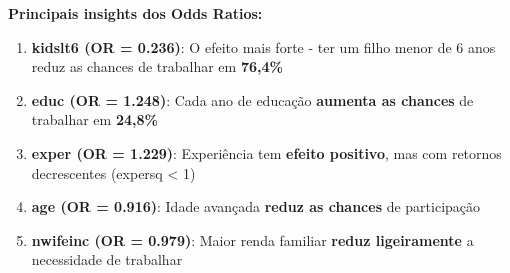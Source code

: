 \documentclass[
  letterpaper,
  DIV=11,
  numbers=noendperiod]{scrartcl}
\providecommand{\tightlist}{%
  \setlength{\itemsep}{0pt}\setlength{\parskip}{0pt}}\usepackage{longtable,booktabs,array}
\begin{document}
\textbf{Principais insights dos Odds Ratios:}

\begin{enumerate}
\def\labelenumi{\arabic{enumi}.}
\tightlist
\item
  \textbf{kidslt6 (OR = 0.236)}: O efeito mais forte - ter um filho
  menor de 6 anos reduz as chances de trabalhar em \textbf{76,4\%}
\item
  \textbf{educ (OR = 1.248)}: Cada ano de educação \textbf{aumenta as
  chances} de trabalhar em \textbf{24,8\%}
\item
  \textbf{exper (OR = 1.229)}: Experiência tem \textbf{efeito positivo},
  mas com retornos decrescentes (expersq \textless{} 1)
\item
  \textbf{age (OR = 0.916)}: Idade avançada \textbf{reduz as chances} de
  participação
\item
  \textbf{nwifeinc (OR = 0.979)}: Maior renda familiar \textbf{reduz
  ligeiramente} a necessidade de trabalhar
\end{enumerate}
\end{document}
